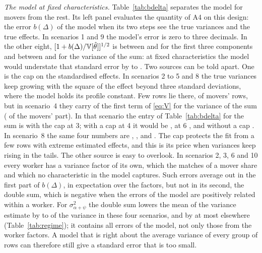\emph{The model at fixed characteristics.} Table~\ref{tab:bdelta} separates the model for movers from the
rest. Its left panel evaluates the quantity of A4 on this design: the error $b(\Delta)$ of the model when its
two steps see the true variances and the true effects. In scenarios 1 and 9 the model's error is zero to three decimals. In the other
eight, $[1+b(\Delta)/\mathbb{V}[\hat\theta]]^{1/2}$ is between  and  for the first
three components and between  and  for the variance of the sum: at fixed
characteristics the model would understate that standard error by  to
. Two sources can be told apart. One is the cap on the standardised effects. In
scenarios 2 to 5 and 8 the true variances keep growing with the square of the effect beyond three standard
deviations, where the model holds its profile constant. Few rows lie there,  of movers'
rows, but in scenario~4 they carry  of the first term of \eqref{eq:V} for the variance
of the sum ( of the movers' part). In that scenario the entry of Table~\ref{tab:bdelta} for the sum is  with the cap at
3; with a cap at 4 it would be , at 6 , and without a cap
. In scenario~8 the same four numbers are , ,
 and . The cap protects the fit from a few rows with extreme estimated effects, and this is its
price when variances keep rising in the tails. The other source is easy to overlook. In scenarios 2, 3, 6 and
10 every worker has a variance factor of its own, which the matches of a mover share and which no
characteristic in the model captures. Such errors average out in the first part of $b(\Delta)$, in expectation
over the factors, but not in its second, the double sum, which is negative when the errors of the model are
positively related within a worker. For $\sigma^2_{\alpha+\psi}$ the double sum lowers the mean of the variance
estimate by  to  of the variance in these four scenarios, and by at
most  elsewhere (Table~\ref{tab:regime}); it contains all errors of the model, not only
those from the worker factors. A model that is right about the average variance of every group of rows can
therefore still give a standard error that is too small.


